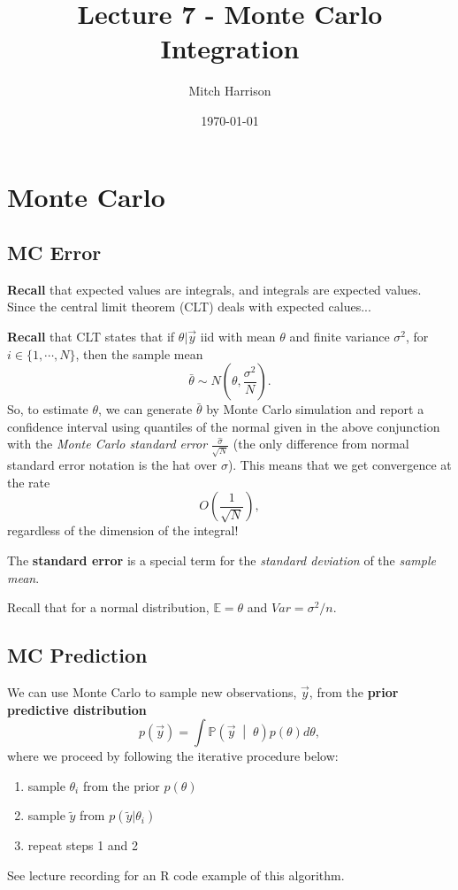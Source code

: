 \documentclass[titlepage, 12pt, leqno]{article}
\title{\Huge{Lecture 7 - Monte Carlo Integration}}
\author{\large{Mitch Harrison}}
\date{\today}
\begin{document}
\setlength{\parskip}{1\baselineskip}
\setlength{\parindent}{15pt}
\maketitle
\tableofcontents
\newpage


\section{Monte Carlo}
\subsection{MC Error}

\textbf{Recall} that expected values are integrals, and integrals are expected
values. Since the central limit theorem (CLT) deals with expected calues...

\textbf{Recall} that CLT states that if $\theta|\vec y$ iid with mean $\theta$ and
finite variance $\sigma^{2}$, for $i \in \{1, \cdots , N\}$, then the sample
mean 
\[
\bar \theta \sim N\left(\theta, \frac{\sigma^{2}}{N}\right).
\]
So, to estimate $\theta$, we can generate $\bar \theta$ by Monte Carlo simulation
and report a confidence interval using quantiles of the normal given in the 
above conjunction with the \textit{Monte Carlo standard error} 
$\frac{\hat \sigma}{\sqrt{N}}$ (the only difference from normal standard error
notation is the hat over $\sigma$). This means that we get convergence at the rate
\[
O\left(\frac{1}{\sqrt{N}}\right),
\]
regardless of the dimension of the integral!

\begin{definition}
    The \textbf{standard error} is a special term for the \textit{standard
    deviation} of the \textit{sample mean}.
\end{definition}

\begin{note}
    Recall that for a normal distribution, $ \mathbb{E} = \theta$ and
    $Var = \sigma^{2}/n$.
\end{note}

\subsection{MC Prediction}
We can use Monte Carlo to sample new observations, $\vec y$, from the 
\textbf{prior predictive distribution}
\[
p(\vec y) = \int \mathbb{P}\left(\vec y \;\middle|\; \theta\right) p(\theta)
d \theta,
\]
where we proceed by following the iterative procedure below:
\begin{enumerate}
    \item sample $\theta_{i}$ from the prior $p(\theta)$
    \item sample $\tilde y$ from $p(\tilde y | \theta_{i})$
    \item repeat steps 1 and 2
\end{enumerate}
\begin{note}
    See lecture recording for an R code example of this algorithm.
\end{note}
\end{document}
